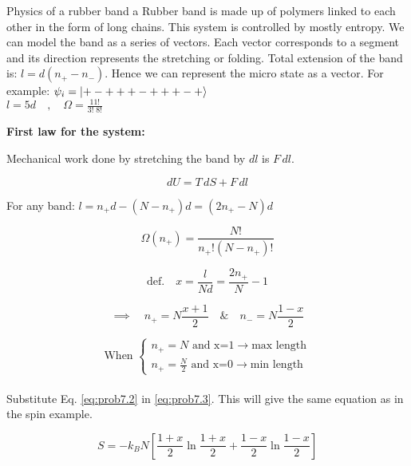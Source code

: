 \begin{problem}{Physics of a rubber band}
    a
Rubber band is made up of polymers linked to each other in the form of long chains. This system is controlled by mostly entropy.
We can model the band as a series of vectors. Each vector corresponds to a segment and its direction represents the stretching or folding. Total extension of the band is: $l=d(n_+ - n_-)$. Hence we can represent the micro state as a vector. For example: $ \psi_i = \left| +-+++-+++-+ \right>$ \\
$l=5d \quad,\quad \Omega = \frac{11!}{3!\;8!}$


\textbf{First law for the system:}

Mechanical work done by stretching the band by $dl$ is $F\,dl$.

\begin{equation}
    dU=T\,dS+F\,dl
\end{equation}

For any band: $l=n_+ d-(N-n_+)d=(2n_+ -N)d$

\begin{equation}
   \Omega(n_+)=\frac{N!}{n_+ ! (N-n_+)!}
   \label{eq:prob7.3}
\end{equation}

\begin{equation*}
    \mathrm{def.}\quad x=\frac{l}{Nd}=\frac{2n_+}{N}-1
\end{equation*}

\begin{equation}
    \implies \quad n_+=N\frac{x+1}{2} \quad \& \quad n_-=N\frac{1-x}{2}
    \label{eq:prob7.2}
\end{equation}

\begin{equation*}
    \textrm{When }
    \begin{cases}
        n_+=N \textrm{ and x=1} \longrightarrow \textrm{max length}\\
        n_+=\frac{N}{2} \textrm{ and x=0} \longrightarrow \textrm{min length}
    \end{cases}
\end{equation*}
\\
Substitute Eq. \ref{eq:prob7.2} in \ref{eq:prob7.3}. This will give the same equation as in the spin example.

\begin{equation}
    S=-k_B N\left[ \frac{1+x}{2}\ln{\frac{1+x}{2}}+\frac{1-x}{2}\ln{\frac{1-x}{2}}\right]
\end{equation}


\end{problem}
